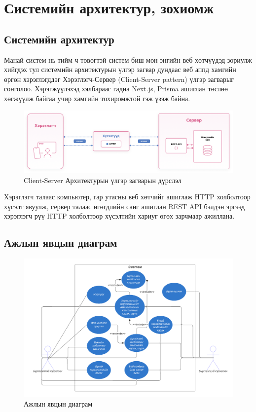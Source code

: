 \chapter{Системийн архитектур, зохиомж}

\section{Системийн архитектур}

Манай систем нь тийм ч төвөгтэй систем биш мөн энгийн веб хөтчүүдэд зориулж хийгдэх тул системийн архитектурын үлгэр загвар дундаас веб аппд хамгийн өргөн хэрэглэгддэг Хэрэглэгч-Сервер (Client-Server pattern) үлгэр загварыг сонголоо. Хэрэгжүүлэхэд хялбараас гадна Next.js, Prisma ашиглан төслөө хөгжүүлж байгаа учир хамгийн тохиромжтой гэж үзэж байна.

\begin{figure}[h]
	\centering
	\includegraphics[width=15cm]{images/architecture.png}
	\caption{Client-Server Архитектурын үлгэр загварын дүрслэл}
	\label{fig:architecture}
\end{figure}

Хэрэглэгч талаас компьютер, гар утасны веб хөтчийг ашиглаж HTTP холболтоор хүсэлт явуулж, сервер талаас өгөгдлийн санг ашиглан REST API бэлдэн эргээд хэрэглэгч рүү HTTP холболтоор хүсэлтийн хариуг өгөх зарчмаар ажиллана.

\section{Ажлын явцын диаграм}

\begin{figure}[h]
	\centering
	\includegraphics[width=15cm]{images/usecase.png}
	\caption{Ажлын явцын диаграм}
	\label{fig:usecase}
\end{figure}

